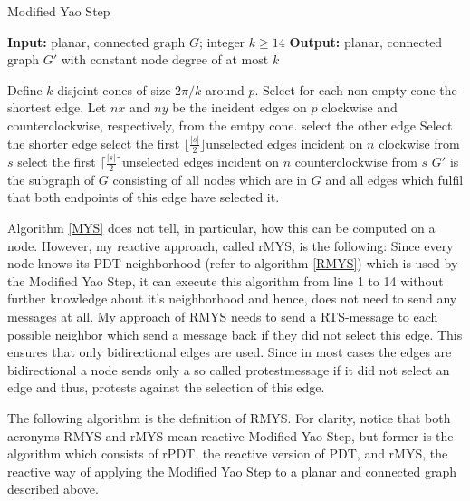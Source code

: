 \algrenewcommand\algorithmicprocedure{\textbf{}}
\begin{algorithm}\small
\caption{Modified Yao Step}\label{MYS}
\begin{algorithmic}[1]
\Statex \textbf{Input:} planar, connected graph $G $; integer $k\geq 14 $
\Statex \textbf{Output:} planar, connected graph $G' $ with constant node degree of at most $k $

\Statex

	\State Define $k $ disjoint cones of size $2\pi/k $ around $p $.
	\State Select for each non empty cone the shortest edge.
			\State Let $nx $ and $ny $ be the incident edges on $p $ clockwise and \State counterclockwise, respectively, from the emtpy cone.
				\State select the other edge
				\Else
				\State Select the shorter edge
			\EndIf 
		\Else
			\State select the first $\lfloor \frac{|s|}{2} \rfloor $unselected edges incident on $n $ clockwise from $s $
			\State select the first $\lceil \frac{|s|}{2} \rceil $unselected edges incident on $n $ counterclockwise from $s $
		\EndIf
	\EndFor
\EndFor
\Statex $ G' $ is the subgraph of $G $ consisting of all nodes which are in $G $ and all edges which fulfil that both endpoints of this edge have selected it. 
\end{algorithmic}
\end{algorithm}
 
Algorithm \ref{MYS} does not tell, in particular, how this can be computed on a node.
However, my reactive approach, called rMYS, is the following: Since every node knows its PDT-neighborhood (refer to algorithm \ref{RMYS}) which is used by the Modified Yao Step, it can execute this algorithm from line 1 to 14 without further knowledge about it's neighborhood and hence, does not need to send any messages at all.
My approach of RMYS needs to send a RTS-message to each possible neighbor which send a message back if they did not select this edge.
This ensures that only bidirectional edges are used.
Since in most cases the edges are bidirectional a node sends only a so called protestmessage if it did not select an edge and thus, protests against the selection of this edge.

The following algorithm is the definition of RMYS.
For clarity, notice that both acronyms RMYS and rMYS mean \grqq reactive Modified Yao Step\grqq, but former is the algorithm which consists of rPDT, the reactive version of PDT, and rMYS, the reactive way of applying the Modified Yao Step to a planar and connected graph described above.
 
